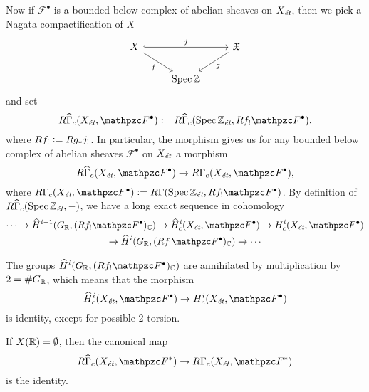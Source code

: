 Now if $\mathcal{F}^\bullet$ is a bounded below complex of abelian sheaves on
$X_\text{\it ét}$, then we pick a Nagata compactification of $X$
\[ \begin{tikzcd}
    X \ar[hookrightarrow]{rr}{j}\ar{dr}[swap]{f} & & \mathfrak{X} \ar{dl}{g} \\
    & \Spec \ZZ
  \end{tikzcd} \]
and set
\[ R\widehat{\Gamma}_c (X_\text{\it ét}, \mathcal{F}^\bullet) \dfn
  R\widehat{\Gamma}_c (\Spec \ZZ_\text{\it ét}, R f_! \mathcal{F}^\bullet), \]
where $R f_! \mathrel{\mathop:}= R g_* j_!$. In particular, the morphism
 gives us for any bounded
below complex of abelian sheaves $\mathcal{F}^\bullet$ on $X_\text{\it ét}$ a
morphism
\begin{equation}
  \label{eqn:morphism-fromRGammahatc-to-RGammac}
  R\widehat{\Gamma}_c (X_\text{\it ét}, \mathcal{F}^\bullet) \to
  R\Gamma_c (X_\text{\it ét}, \mathcal{F}^\bullet),
\end{equation}
where
$R\Gamma_c (X_\text{\it ét}, \mathcal{F}^\bullet) \dfn R\Gamma (\Spec \ZZ_\text{\it ét}, R f_! \mathcal{F}^\bullet)$.
By definition of $R\widehat{\Gamma}_c (\operatorname{Spec} \mathbb{Z}_\text{\it ét}, -)$, we have a
long exact sequence in cohomology
\begin{multline}
  \label{eqn:Hc-hat-vs-Hc-les}
  \cdots \to \widehat{H}^{i-1} (G_\RR, (Rf_! \mathcal{F}^\bullet)_\CC) \to
  \widehat{H}^i_c (X_\text{\it ét}, \mathcal{F}^\bullet) \to
  H^i_c (X_\text{\it ét}, \mathcal{F}^\bullet) \\
  \to \widehat{H}^i (G_\RR, (Rf_!  \mathcal{F}^\bullet)_\CC) \to \cdots
\end{multline}

The groups $\widehat{H}^i (G_\RR, (Rf_! \mathcal{F}^\bullet)_\CC)$ are
annihilated by multiplication by $2 = \# G_{\mathbb{R}}$, which means that the morphism
\[ \widehat{H}^i_c (X_\text{\it ét}, \mathcal{F}^\bullet) \to
  H^i_c (X_\text{\it ét}, \mathcal{F}^\bullet) \]
is identity, except for possible $2$-torsion.

\begin{remark}
  \label{rmk:compact-support-a-la-Milne-with-no-real-points}
  If $X (\mathbb{R}) = \emptyset$, then the canonical map
  \[ R\widehat{\Gamma}_c (X_\text{\it ét}, \mathcal{F}^*) \to
    R\Gamma_c (X_\text{\it ét}, \mathcal{F}^*) \]
  is the identity.
\end{remark}


